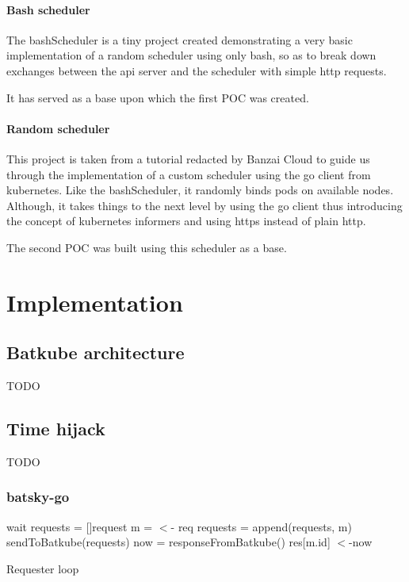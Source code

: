 \documentclass[12pt]{report}
\begin{document}
\subsubsection{Bash scheduler}

The bashScheduler\cite{bashScheduler} is a tiny project created demonstrating a
very basic implementation of a random scheduler using only bash, so as to break
down exchanges between the api server and the scheduler with simple http
requests.

It has served as a base upon which the first POC was created.

\subsubsection{Random scheduler}

This project is taken from a tutorial\cite{banzai-tuto} redacted by Banzai
Cloud to guide us through the implementation of a custom scheduler using the go
client\cite{client-go} from kubernetes.
Like the bashScheduler, it randomly binds pods on available nodes. Although, it
takes things to the next level by using the go client thus introducing the
concept of kubernetes informers and using https instead of plain http.

The second POC was built using this scheduler as a base.

\chapter{Implementation}

\section{Batkube architecture}
TODO

\section{Time hijack}
TODO

\subsection{batsky-go}


\begin{algorithm}[H]
\DontPrintSemicolon
{}
 {
	wait\;
}
requests = []request\;
 {
	m = $<$- req 
	requests = append(requests, m)\;
}
sendToBatkube(requests) 
now = responseFromBatkube()\;
 {
	res[m.id] $<$-now 
}

	
\caption{Requester loop}
\label{alg:reqLoop}
\end{algorithm}
\end{document}
